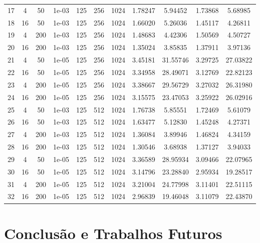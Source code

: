 \documentclass{automatextcc}
\begin{document}
\begin{table}
{\begin{tabular}[t]{ccccccccccc}
            17 & 4 & 50 & 1e-03 & 125 & 256 & 1024 & 1.78247 & 5.94452 & 1.73868 & 5.68985 \\
            18 & 16 & 50 & 1e-03 & 125 & 256 & 1024 & 1.66020 & 5.26036 & 1.45117 & 4.26811 \\
            19 & 4 & 200 & 1e-03 & 125 & 256 & 1024 & 1.48683 & 4.42306 & 1.50569 & 4.50727 \\
            20 & 16 & 200 & 1e-03 & 125 & 256 & 1024 & 1.35024 & 3.85835 & 1.37911 & 3.97136 \\
            21 & 4 & 50 & 1e-05 & 125 & 256 & 1024 & 3.45181 & 31.55746 & 3.29725 & 27.03822 \\
            22 & 16 & 50 & 1e-05 & 125 & 256 & 1024 & 3.34958 & 28.49071 & 3.12769 & 22.82123 \\
            23 & 4 & 200 & 1e-05 & 125 & 256 & 1024 & 3.38667 & 29.56729 & 3.27032 & 26.31980 \\
            24 & 16 & 200 & 1e-05 & 125 & 256 & 1024 & 3.15575 & 23.47053 & 3.25922 & 26.02916 \\
            25 & 4 & 50 & 1e-03 & 125 & 512 & 1024 & 1.76738 & 5.85551 & 1.72469 & 5.61079 \\
            26 & 16 & 50 & 1e-03 & 125 & 512 & 1024 & 1.63477 & 5.12830 & 1.45248 & 4.27371 \\
            27 & 4 & 200 & 1e-03 & 125 & 512 & 1024 & 1.36084 & 3.89946 & 1.46824 & 4.34159 \\
            28 & 16 & 200 & 1e-03 & 125 & 512 & 1024 & 1.30546 & 3.68938 & 1.37127 & 3.94033 \\
            29 & 4 & 50 & 1e-05 & 125 & 512 & 1024 & 3.36589 & 28.95934 & 3.09466 & 22.07965 \\
            30 & 16 & 50 & 1e-05 & 125 & 512 & 1024 & 3.14796 & 23.28840 & 2.95934 & 19.28517 \\
            31 & 4 & 200 & 1e-05 & 125 & 512 & 1024 & 3.21004 & 24.77998 & 3.11401 & 22.51115\\
            32 & 16 & 200 & 1e-05 & 125 & 512 & 1024 & 2.96839 & 19.46048 & 3.11079 & 22.43870\\
            \bottomrule
        \end{tabular}
    }
\end{table}


\chapter{Conclusão e Trabalhos Futuros}





\end{document}
